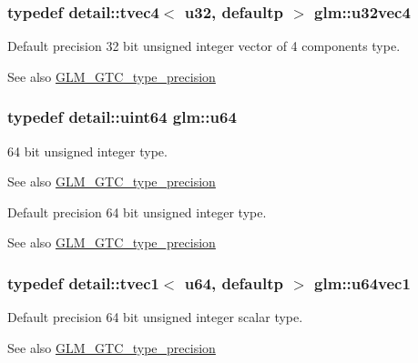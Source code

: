 \subsubsection[{\texorpdfstring{u32vec4}{u32vec4}}]{\setlength{\rightskip}{0pt plus 5cm}typedef detail\+::tvec4$<$ u32, defaultp $>$ {\bf glm\+::u32vec4}}\hypertarget{group__gtc__type__precision_ga7e4574f8327a2f576baf2617343d0170}{}\label{group__gtc__type__precision_ga7e4574f8327a2f576baf2617343d0170}
Default precision 32 bit unsigned integer vector of 4 components type. \begin{DoxySeeAlso}{See also}
\hyperlink{group__gtc__type__precision}{G\+L\+M\+\_\+\+G\+T\+C\+\_\+type\+\_\+precision} 
\end{DoxySeeAlso}
\subsubsection[{\texorpdfstring{u64}{u64}}]{\setlength{\rightskip}{0pt plus 5cm}typedef detail\+::uint64 {\bf glm\+::u64}}\hypertarget{group__gtc__type__precision_ga71cedd4972f9cb1a5e14dfe5ab83ecd7}{}\label{group__gtc__type__precision_ga71cedd4972f9cb1a5e14dfe5ab83ecd7}
64 bit unsigned integer type. \begin{DoxySeeAlso}{See also}
\hyperlink{group__gtc__type__precision}{G\+L\+M\+\_\+\+G\+T\+C\+\_\+type\+\_\+precision}
\end{DoxySeeAlso}
Default precision 64 bit unsigned integer type. \begin{DoxySeeAlso}{See also}
\hyperlink{group__gtc__type__precision}{G\+L\+M\+\_\+\+G\+T\+C\+\_\+type\+\_\+precision} 
\end{DoxySeeAlso}
\subsubsection[{\texorpdfstring{u64vec1}{u64vec1}}]{\setlength{\rightskip}{0pt plus 5cm}typedef detail\+::tvec1$<$ u64, defaultp $>$ {\bf glm\+::u64vec1}}\hypertarget{group__gtc__type__precision_ga7d5145019ad749f4becd39ce8e786a5f}{}\label{group__gtc__type__precision_ga7d5145019ad749f4becd39ce8e786a5f}
Default precision 64 bit unsigned integer scalar type. \begin{DoxySeeAlso}{See also}
\hyperlink{group__gtc__type__precision}{G\+L\+M\+\_\+\+G\+T\+C\+\_\+type\+\_\+precision} 
\end{DoxySeeAlso}
